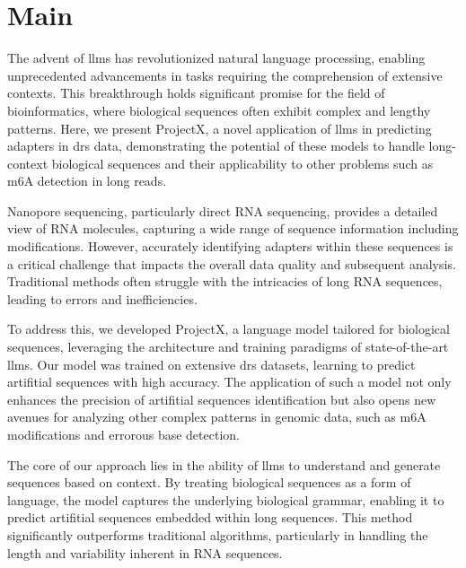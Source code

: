 \documentclass[pdflatex, sn-mathphys-num, lineno]{sn-jnl}%
\newcommand{\chopper}{ProjectX\xspace}
\theoremstyle{thmstyleone}%
\theoremstyle{thmstyletwo}%
\theoremstyle{thmstylethree}%
\begin{document}
\maketitle

\section{Main}\label{sec1}


The advent of \glspl{llm} has revolutionized natural language processing, enabling unprecedented advancements in tasks requiring the comprehension of extensive contexts.
This breakthrough holds significant promise for the field of bioinformatics, where biological sequences often exhibit complex and lengthy patterns.
Here, we present \chopper, a novel application of \glspl{llm} in predicting adapters in \gls{drs} data, demonstrating the potential of these models to handle long-context biological sequences and their applicability to other problems such as m6A detection in long reads.

Nanopore sequencing, particularly direct RNA sequencing, provides a detailed view of RNA molecules, capturing a wide range of sequence information including modifications.
However, accurately identifying adapters within these sequences is a critical challenge that impacts the overall data quality and subsequent analysis.
Traditional methods often struggle with the intricacies of long RNA sequences, leading to errors and inefficiencies.

To address this, we developed \chopper, a language model tailored for biological sequences, leveraging the architecture and training paradigms of state-of-the-art \glspl{llm}.
Our model was trained on extensive \gls{drs} datasets, learning to predict artifitial sequences with high accuracy.
The application of such a model not only enhances the precision of artifitial sequences identification but also opens new avenues for analyzing other complex patterns in genomic data, such as m6A modifications and errorous base detection.

The core of our approach lies in the ability of \glspl{llm} to understand and generate sequences based on context.
By treating biological sequences as a form of language, the model captures the underlying biological grammar, enabling it to predict  artifitial sequences embedded within long sequences.
This method significantly outperforms traditional algorithms, particularly in handling the length and variability inherent in RNA sequences.
\end{document}
